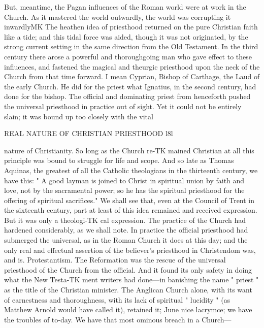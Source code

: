 \documentclass[12pt,a5paper,twoside]{book}
\begin{document}
{But, meantime, the Pagan influences of the Roman 
world were at work in the Church. As it mastered 
the world outwardly, the world was corrupting it 
inwardlyMK The heathen idea of priesthood returned 
on the pure Christian faith like a tide; and this tidal 
force was aided, though it was not originated, by the 
strong current setting in the same direction from the 
Old Testament. In the third century there arose a 
powerful and thoroughgoing man who gave effect 
to these influences, and fastened the magical and 
theurgic priesthood upon the neck of the Church 
from that time forward. I mean Cyprian, Bishop 
of Carthage, the Laud of the early Church. He did 
for the priest what Ignatius, in the second century, 
had done for the bishop. The official and dominating 
priest from henceforth pushed the universal priesthood 
in practice out of sight. Yet it could not be entirely 
slain; it was bound up too closely with the vital 



REAL NATURE OF CHRISTIAN PRIESTHOOD l8l 

nature of Christianity. So long as the Church re-TK
mained Christian at all this principle was bound to 
struggle for life and scope. And so late as Thomas 
Aquinas, the greatest of all the Catholic theologians in 
the thirteenth century, we have this: " A good layman 
is joined to Christ in spiritual union by faith and love, 
not by the sacramental power; so he has the spiritual 
priesthood for the offering of spiritual sacrifices." We 
shall see that, even at the Council of Trent in the 
sixteenth century, part at least of this idea remained 
and received expression. But it was only a theologi-TK
cal expression. The practice of the Church had 
hardened considerably, as we shall note. In practice 
the official priesthood had submerged the universal, as 
in the Roman Church it does at this day; and the 
only real and effectual assertion of the believer's 
priesthood in Christendom was, and is. Protestantism. 
The Reformation was the rescue of the universal 
priesthood of the Church from the official. And it 
found its only safety in doing what the New Testa-TK
ment writers had done---in banishing the name 
" priest " as the title of the Christian minister. The 
Anglican Church alone, with its want of earnestness 
and thoroughness, with its lack of spiritual " lucidity " 
(as Matthew Arnold would have called it), retained it; 
June nice lacrymce; we have the troubles of to-day. 
We have that most ominous breach in a Church---



}
\end{document}
